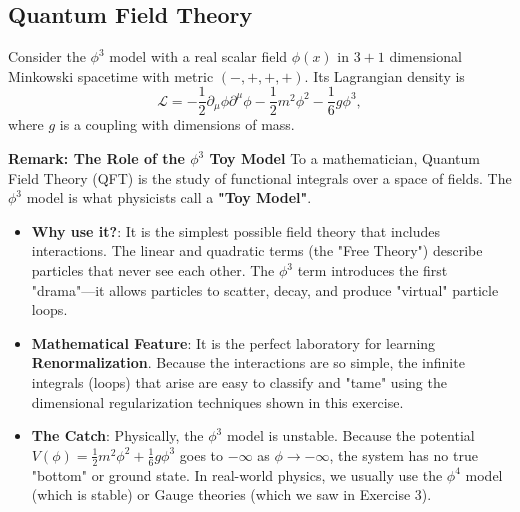 \subsection{Quantum Field Theory}

\begin{exercise}
\label{physics:2023:6}
Consider the $\phi ^ { 3 }$ model with a real scalar field $\phi ( x )$ in $3 + 1$ dimensional Minkowski spacetime with metric $( - , + , + , + )$. Its Lagrangian density is
\begin{equation}
    \mathcal {L} = - \frac {1}{2} \partial_ {\mu} \phi \partial^ {\mu} \phi - \frac {1}{2} m ^ {2} \phi^ {2} - \frac {1}{6} g \phi^ {3}, \label{eq:2023:6:11}
\end{equation}
where $g$ is a coupling with dimensions of mass.

\textbf{Remark: The Role of the $\phi^3$ Toy Model}
To a mathematician, Quantum Field Theory (QFT) is the study of functional integrals over a space of fields. The $\phi^3$ model is what physicists call a \textbf{"Toy Model"}.
\begin{itemize}
    \item \textbf{Why use it?}: It is the simplest possible field theory that includes interactions. The linear and quadratic terms (the "Free Theory") describe particles that never see each other. The $\phi^3$ term introduces the first "drama"---it allows particles to scatter, decay, and produce "virtual" particle loops.
    \item \textbf{Mathematical Feature}: It is the perfect laboratory for learning \textbf{Renormalization}. Because the interactions are so simple, the infinite integrals (loops) that arise are easy to classify and "tame" using the dimensional regularization techniques shown in this exercise.
    \item \textbf{The Catch}: Physically, the $\phi^3$ model is unstable. Because the potential $V(\phi) = \frac{1}{2}m^2\phi^2 + \frac{1}{6}g\phi^3$ goes to $-\infty$ as $\phi \to -\infty$, the system has no true "bottom" or ground state. In real-world physics, we usually use the $\phi^4$ model (which is stable) or Gauge theories (which we saw in Exercise 3).
\end{itemize}


\end{exercise}
